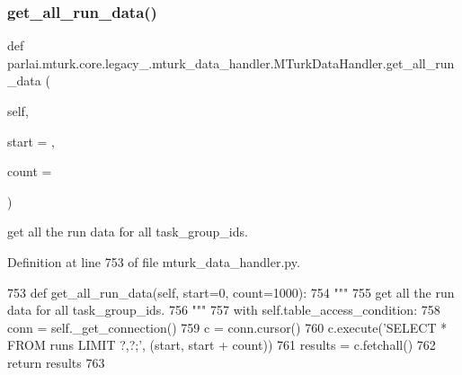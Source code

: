 \subsubsection{\texorpdfstring{get\+\_\+all\+\_\+run\+\_\+data()}{get\_all\_run\_data()}}
{\footnotesize\ttfamily def parlai.\+mturk.\+core.\+legacy\+\_.\+mturk\+\_\+data\+\_\+handler.\+M\+Turk\+Data\+Handler.\+get\+\_\+all\+\_\+run\+\_\+data (\begin{DoxyParamCaption}\item[{}]{self,  }\item[{}]{start = {},  }\item[{}]{count = {} }\end{DoxyParamCaption})}

\begin{DoxyVerb}get all the run data for all task_group_ids.
\end{DoxyVerb}
 

Definition at line 753 of file mturk\+\_\+data\+\_\+handler.\+py.


\begin{DoxyCode}
753     \textcolor{keyword}{def }get\_all\_run\_data(self, start=0, count=1000):
754         \textcolor{stringliteral}{"""}
755 \textcolor{stringliteral}{        get all the run data for all task\_group\_ids.}
756 \textcolor{stringliteral}{        """}
757         with self.table\_access\_condition:
758             conn = self.\_get\_connection()
759             c = conn.cursor()
760             c.execute(\textcolor{stringliteral}{'SELECT * FROM runs LIMIT ?,?;'}, (start, start + count))
761             results = c.fetchall()
762             \textcolor{keywordflow}{return} results
763 
\end{DoxyCode}
\mbox{\label{classparlai_1_1mturk_1_1core_1_1legacy__2018_1_1mturk__data__handler_1_1MTurkDataHandler_aff3a140237918d45b8ba6772b4d9473b}} 
